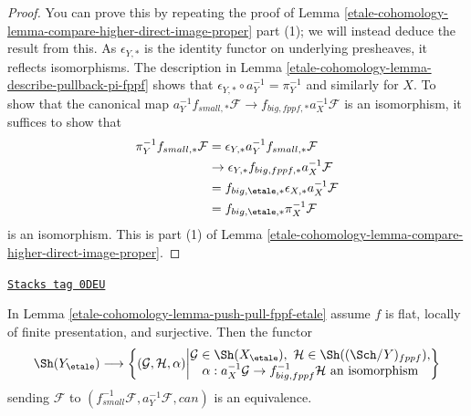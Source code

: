 \begin{proof}
You can prove this by repeating the proof of
Lemma \ref{etale-cohomology-lemma-compare-higher-direct-image-proper} part (1);
we will instead deduce the result from this.
As $\epsilon_{Y, *}$ is the identity functor on underlying presheaves,
it reflects isomorphisms. The description
in Lemma \ref{etale-cohomology-lemma-describe-pullback-pi-fppf}
shows that $\epsilon_{Y, *} \circ a_Y^{-1} = \pi_Y^{-1}$
and similarly for $X$. To show that the canonical map
$a_Y^{-1}f_{small, *}\mathcal{F} \to f_{big, fppf, *}a_X^{-1}\mathcal{F}$
is an isomorphism, it suffices to show that
\begin{align*}
\pi_Y^{-1}f_{small, *}\mathcal{F}
& =
\epsilon_{Y, *}a_Y^{-1}f_{small, *}\mathcal{F} \\
& \to
\epsilon_{Y, *}f_{big, fppf, *}a_X^{-1}\mathcal{F} \\
& =
f_{big, \etale, *} \epsilon_{X, *}a_X^{-1}\mathcal{F} \\
& =
f_{big, \etale, *}\pi_X^{-1}\mathcal{F}
\end{align*}
is an isomorphism. This is part
(1) of Lemma \ref{etale-cohomology-lemma-compare-higher-direct-image-proper}.
\end{proof}

\begin{lemma}
\label{etale-cohomology-lemma-descent-sheaf-fppf-etale}
\href{https://stacks.math.columbia.edu/tag/0DEU}{\texttt{Stacks tag 0DEU}}

In Lemma \ref{etale-cohomology-lemma-push-pull-fppf-etale} assume
$f$ is flat, locally of finite presentation, and surjective.
Then the functor
$$
\Sh(Y_\etale) \longrightarrow
\left\{
(\mathcal{G}, \mathcal{H}, \alpha)
\middle|
\begin{matrix}
\mathcal{G} \in \Sh(X_\etale),\ \mathcal{H} \in \Sh((\Sch/Y)_{fppf}), \\
\alpha : a_X^{-1}\mathcal{G} \to f_{big, fppf}^{-1}\mathcal{H}
\text{ an isomorphism}
\end{matrix}
\right\}
$$
sending $\mathcal{F}$ to
$(f_{small}^{-1}\mathcal{F}, a_Y^{-1}\mathcal{F}, can)$ is an equivalence.
\end{lemma}

